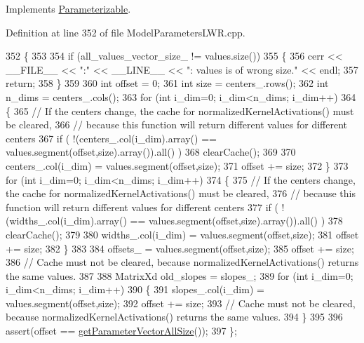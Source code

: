 Implements \hyperlink{classDmpBbo_1_1Parameterizable_acef2ee975b497baf60b1f38da2b65f0d}{Parameterizable}.



Definition at line 352 of file Model\+Parameters\+L\+W\+R.\+cpp.


\begin{DoxyCode}
352                                                                      \{
353 
354   \textcolor{keywordflow}{if} (all\_values\_vector\_size\_ != values.size())
355   \{
356     cerr << \_\_FILE\_\_ << \textcolor{stringliteral}{":"} << \_\_LINE\_\_ << \textcolor{stringliteral}{": values is of wrong size."} << endl;
357     \textcolor{keywordflow}{return};
358   \}
359   
360   \textcolor{keywordtype}{int} offset = 0;
361   \textcolor{keywordtype}{int} size = centers\_.rows();
362   \textcolor{keywordtype}{int} n\_dims = centers\_.cols();
363   \textcolor{keywordflow}{for} (\textcolor{keywordtype}{int} i\_dim=0; i\_dim<n\_dims; i\_dim++)
364   \{
365     \textcolor{comment}{// If the centers change, the cache for normalizedKernelActivations() must be cleared,}
366     \textcolor{comment}{// because this function will return different values for different centers}
367     \textcolor{keywordflow}{if} ( !(centers\_.col(i\_dim).array() == values.segment(offset,size).array()).all() )
368       clearCache();
369     
370     centers\_.col(i\_dim) = values.segment(offset,size);
371     offset += size;
372   \}
373   \textcolor{keywordflow}{for} (\textcolor{keywordtype}{int} i\_dim=0; i\_dim<n\_dims; i\_dim++)
374   \{
375     \textcolor{comment}{// If the centers change, the cache for normalizedKernelActivations() must be cleared,}
376     \textcolor{comment}{// because this function will return different values for different centers}
377     \textcolor{keywordflow}{if} ( !(widths\_.col(i\_dim).array() == values.segment(offset,size).array()).all() )
378       clearCache();
379     
380     widths\_.col(i\_dim) = values.segment(offset,size);
381     offset += size;
382   \}
383 
384   offsets\_ = values.segment(offset,size);
385   offset += size;
386   \textcolor{comment}{// Cache must not be cleared, because normalizedKernelActivations() returns the same values.}
387 
388   MatrixXd old\_slopes = slopes\_;
389   \textcolor{keywordflow}{for} (\textcolor{keywordtype}{int} i\_dim=0; i\_dim<n\_dims; i\_dim++)
390   \{
391     slopes\_.col(i\_dim) = values.segment(offset,size);
392     offset += size;
393     \textcolor{comment}{// Cache must not be cleared, because normalizedKernelActivations() returns the same values.}
394   \}
395 
396   assert(offset == \hyperlink{classDmpBbo_1_1ModelParametersLWR_ab24d2485b3b795b516f4844f225100eb}{getParameterVectorAllSize}());   
397 \};
\end{DoxyCode}


